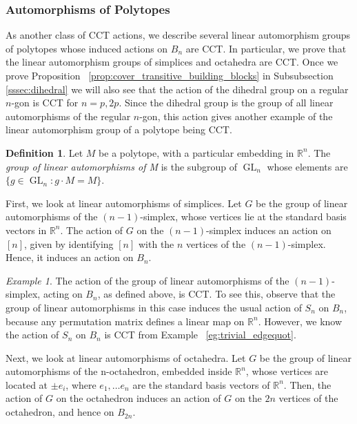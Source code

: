 \documentclass[smallextended, envcountsame, numbook]{svjour3}
\theoremstyle{plain}
\theoremstyle{definition}
\newtheorem{defn}[thm]{Definition}
\theoremstyle{remark}
\newtheorem{eg}[thm]{Example}
\numberwithin{equation}{section}
\newcommand\sssec{\subsubsection}
\begin{document}
\sssec{Automorphisms of Polytopes}
\label{sssec:polytopes}

As another class of CCT actions, we describe several linear automorphism groups of polytopes whose induced actions on $B_n$ are CCT. In particular, we prove that the linear automorphism groups of simplices and octahedra are CCT.
Once we prove Proposition ~\ref{prop:cover_transitive_building_blocks} in Subsubsection \ref{sssec:dihedral} we will also see that the action of the dihedral group on a regular $n$-gon is CCT for $n = p,2p$.  Since the dihedral group is the group of all linear automorphisms of the regular $n$-gon, this action gives another example of the linear automorphism group of a polytope being CCT.

\begin{defn}
Let $M$ be a polytope, with a particular embedding in $\mathbb R^n$. The {\it group of linear automorphisms of M} is the subgroup of $\operatorname{GL}_n$ whose elements are $\{g \in \operatorname{GL}_n\colon g \cdot M = M\}$.
\end{defn}

First, we look at linear automorphisms of simplices. Let $G$ be the group of linear automorphisms of the $(n-1)$-simplex, whose vertices lie at the standard basis vectors in $\mathbb R^n$. The action of $G$ on the $(n-1)$-simplex induces an action on $[n]$, given by identifying $[n]$ with the $n$ vertices of the $(n-1)$-simplex. Hence, it induces an action on $B_n$.

\begin{eg}
The action of the group of linear automorphisms of the $(n-1)$-simplex, acting on $B_n$, as defined above, is CCT. To see this, observe that the group of linear automorphisms in this case induces the usual action of $S_n$ on $B_n$, because any permutation matrix defines a linear map on $\mathbb R^n$. However, we know the action of $S_n$ on $B_n$ is CCT from Example ~\ref{eg:trivial_edgequot}.
\end{eg}

Next, we look at linear automorphisms of octahedra. Let $G$ be the group of linear automorphisms of the n-octahedron, embedded inside $\mathbb R^n$, whose vertices are located at $\pm e_i$, where $e_1,\ldots e_n$ are the standard basis vectors of $\mathbb R^n$. Then, the action of $G$ on the octahedron induces an action of $G$ on the $2n$ vertices of the octahedron, and hence on $B_{2n}$.
\end{document}
